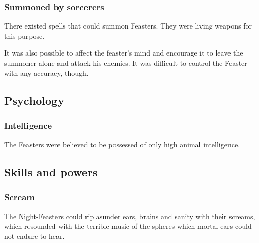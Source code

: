 \subsubsection{Summoned by sorcerers}
There existed spells that could summon Feasters. 
They were living weapons  for this purpose. 

It was also possible to affect the feaster's mind and encourage it to leave the summoner alone and attack his enemies. 
It was difficult to control the Feaster with any accuracy, though. 









\subsection{Psychology}





\subsubsection{Intelligence}
The Feasters were believed to be possessed of only high animal intelligence. 









\subsection{Skills and powers}





\subsubsection{Scream}
The Night-Feasters could rip asunder ears, brains and sanity with their screams, which resounded with the terrible music of the spheres which mortal ears could not endure to hear. 















